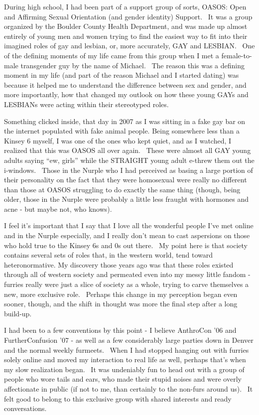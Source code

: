 During high school, I had been part of a support group of sorts, OASOS:
Open and Affirming Sexual Orientation (and gender identity) Support. ~It
was a group organized by the Boulder County Health Department, and was
made up almost entirely of young men and women trying to find the
easiest way to fit into their imagined roles of gay and lesbian, or,
more accurately, GAY and LESBIAN. ~One of the defining moments of my
life came from this group when I met a female-to-male transgender guy by
the name of Michael. ~The reason this was a defining moment in my life
(and part of the reason Michael and I started dating) was because it
helped me to understand the difference between sex and gender, and more
importantly, how that changed my outlook on how these young GAYs and
LESBIANs were acting within their stereotyped roles.

Something clicked inside, that day in 2007 as I was sitting in a fake
gay bar on the internet populated with fake animal people. Being
somewhere less than a Kinsey 6 myself, I was one of the ones who kept
quiet, and as I watched, I realized that this was OASOS all over again.
~These were almost all GAY young adults saying ``ew, girls'' while the
STRAIGHT young adult e-threw them out the i-windows. ~Those in the
Nurple who I had perceived as basing a large portion of their
personality on the fact that they were homosexual were really no
different than those at OASOS struggling to do exactly the same thing
(though, being older, those in the Nurple were probably a little less
fraught with hormones and acne - but maybe not, who knows).

I feel it's important that I say that I love all the wonderful people
I've met online and in the Nurple especially, and I really don't mean to
cast aspersions on those who hold true to the Kinsey 6s and 0s out
there. ~My point here is that society contains several sets of roles
that, in the western world, tend toward heteronormative. My discovery
those years ago was that these roles existed through all of western
society and permeated even into my messy little fandom - furries really
were just a slice of society as a whole, trying to carve themselves a
new, more exclusive role. ~Perhaps this change in my perception began
even sooner, though, and the shift in thought was more the final step
after a long build-up.

I had been to a few conventions by this point - I believe AnthroCon '06
and FurtherConfusion '07 - as well as a few considerably large parties
down in Denver and the normal weekly furmeets. ~When I had stopped
hanging out with furries solely online and moved my interaction to real
life as well, perhaps that's when my slow realization began. ~It was
undeniably fun to head out with a group of people who wore tails and
ears, who made their stupid noises and were overly affectionate in
public (if not to me, than certainly to the non-furs around us). ~It
felt good to belong to this exclusive group with shared interests and
ready conversations.

